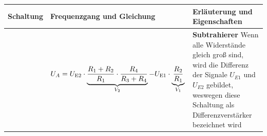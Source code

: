 \newpage



\begin{table}[ht]
    \begin{tabular}{|m{}|m{}|m{}|}
                \hline
        Schaltung & Frequenzgang und Gleichung & Erläuterung und Eigenschaften \\ %
        \hline
        
                  &
        \begin{center}
            
        \end{center}
        \vspace{1ex}
        \[
            \begin{aligned}
                {U_A} = {U_{{\textnormal{E2}}}} \cdot \underbrace{ \frac{R_1 + R_2}{R_1} \cdot \frac{R_4}{R_3 + R_4}}_{V_2} - U_{\textnormal{E1}} \cdot \underbrace{\frac{R_2}{R_1}}_{V_1}
            \end{aligned}
        \]
                  &
        \textbf{Subtrahierer}\newline
        \index{Operationsverstärker>Subtrahierer}
        Wenn alle Widerstände gleich groß sind, wird die Differenz der Signale $U_{E1}$ und $U_{E2}$ gebildet, weswegen diese Schaltung als Differenzverstärker bezeichnet wird
        \\ %
        \hline


\end{tabular}
\end{table}
